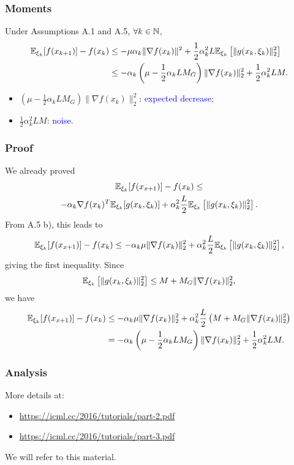 \documentclass{beamer}
\begin{document}
\begin{frame}
\frametitle{Moments}

\begin{theorem}
	Under Assumptions A.1 and A.5, $\forall k \in {\mathbb{N}}$,
	\begin{align*}
		{\mathbb{E}}_{\xi_k}[f(x_{k+1})] - f(x_k)
		& \leq - \mu \alpha_k \| \nabla f(x_k) \|^2
		+ \frac{1}{2} \alpha_k^2 L {\mathbb{E}}_{\xi_k} \left[ \| g(x_k, \xi_k )\|_2^2 \right] \\
		& \leq - \alpha_k\left( \mu -\frac{1}{2}\alpha_k LM_G \right) \| \nabla f(x_k) \|_2^2
		+ \frac{1}{2} \alpha_k^2 LM.
	\end{align*}
\end{theorem}
\begin{itemize}
	\item $\left( \mu -\frac{1}{2}\alpha_k LM_G \right) \| \nabla f(x_k) \|_2^2$: \textcolor{blue}{expected decrease};
	\item $\frac{1}{2} \alpha_k^2 LM$: \textcolor{blue}{noise}.
\end{itemize}
\end{frame}

\begin{frame}
\frametitle{Proof}

We already proved
\begin{multline*}
	{\mathbb{E}}_{\xi_k} [f(x_{x+1})] - f(x_k) \leq \\ - \alpha_k \nabla f(x_k)^T {\mathbb{E}}_{\xi_k} [ g(x_k, \xi_k) ] + \alpha_k^2 \frac{L}{2} {\mathbb{E}}_{\xi_k} \left[ \| g(x_k, \xi_k) \|^2_2 \right].	
\end{multline*}
From A.5 b), this leads to
$$
{\mathbb{E}}_{\xi_k} [f(x_{x+1})] - f(x_k) \leq - \alpha_k \mu \| \nabla f(x_k) \|_2^2 + \alpha_k^2 \frac{L}{2} {\mathbb{E}}_{\xi_k} \left[ \| g(x_k, \xi_k) \|^2_2 \right],
$$
giving the first inequality. Since
$$
{\mathbb{E}}_{\xi_k} \left[ \| g(x_k, \xi_k) \|^2_2 \right] \leq M + M_G \| \nabla f(x_k) \|_2^2,
$$
we have
\begin{align*}
{\mathbb{E}}_{\xi_k} [f(x_{x+1})] - f(x_k) & \leq - \alpha_k \mu \| \nabla f(x_k) \|_2^2 + \alpha_k^2 \frac{L}{2} \left( M + M_G \| \nabla f(x_k) \|_2^2 \right) \\
& =  - \alpha_k \left( \mu - \frac{1}{2} \alpha_k L M_G \right) \| \nabla f(x_k) \|_2^2 + \frac{1}{2} \alpha_k^2 LM.
\end{align*}

\end{frame}

\begin{frame}
\frametitle{Analysis}

More details at:
\begin{itemize}
\item 
\url{https://icml.cc/2016/tutorials/part-2.pdf}
\item 
\url{https://icml.cc/2016/tutorials/part-3.pdf}
\end{itemize}

We will refer to this material.

\end{frame}
\end{document}
